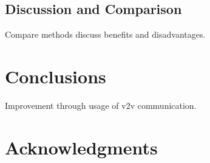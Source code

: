 \documentclass{sig-alternate}
\begin{document}
\subsection{Discussion and Comparison} Compare methods discuss benefits and disadvantages.
\section{Conclusions}
Improvement through usage of v2v communication. 

\section{Acknowledgments}


%

%
%
%


\end{document}

